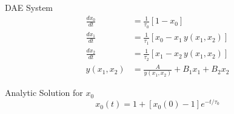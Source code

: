 \vspace{-0.2in}

\begin{block}{DAE System}
\begin{align*}
\frac{dx_0}{dt} &= \frac{1}{\tau_0}[1 - x_0] \\
\frac{dx_1}{dt} &= \frac{1}{\tau_1}[x_0 - x_1 \, y(x_1, x_2)] \\
\frac{dx_2}{dt} &= \frac{1}{\tau_2}[x_1 - x_2 \, y(x_1, x_2)] \\
y(x_1, x_2) &= \frac{A}{y(x_1, x_2)} + B_1 x_1 + B_2 x_2
\end{align*}
\end{block}

\begin{block}{Analytic Solution for $x_0$}
\begin{equation*}
x_0(t) = 1 + [x_0(0) - 1]e^{-t/\tau_0}
\end{equation*}
\end{block}

